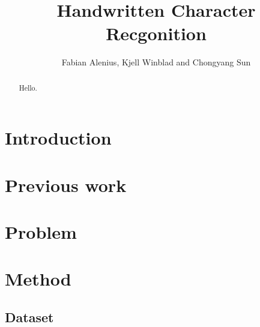\documentclass[11pt]{article}
\author{Fabian Alenius, Kjell Winblad and Chongyang Sun} \title{Handwritten Character Recgonition}
\begin{document}
\maketitle

\begin{abstract}
Hello.

\end{abstract}

\section{Introduction}

\cite{trec}


\section{Previous work}

\section{Problem}

\section{Method}\label{sec:method}





\subsection{Dataset}\label{sec:dataset}
\end{document}
